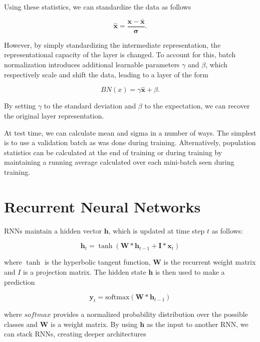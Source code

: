 \documentclass{article}
\def\x{{\mathbf x}}
\begin{document}
Using these statistics, we can standardize the data as follows

\begin{equation}
	\hat \x = \frac{\x - \bar \x}{\mathbf \sigma}.
\end{equation}

However, by simply standardizing the intermediate representation, the representational capacity of the layer is changed. To account for this, batch normalization introduces additional learnable parameters $\gamma$ and $\beta$, which respectively scale and shift the data, leading to a layer of the form

\begin{equation}
	BN(x) = \gamma \hat \x + \beta.
\end{equation}

By setting $\gamma$ to the standard deviation and $\beta$ to the expectation, we can recover the original layer representation.

At test time, we can calculate mean and sigma in a number of ways. The simplest is to use a validation batch as was done during training. Alternatively, population statistics can be calculated at the end of training or during training by maintaining a running average calculated over each mini-batch seen during training.

\section{Recurrent Neural Networks}
RNNs maintain a hidden vector $\mathbf h$, which is updated at time step $t$ as follows:
 
\begin{equation}
	\mathbf h_t = \tanh(\mathbf W * \mathbf h_{t-1} + \mathbf I * \x_t)
\end{equation}

where $\tanh$ is the hyperbolic tangent function, $\mathbf W$ is the recurrent weight matrix and $I$ is a projection matrix. The hidden state $\mathbf h$ is then used to make a prediction

\begin{equation}
	\mathbf y_t = \text{softmax}(\mathbf W * \mathbf h_{t-1})
\end{equation}

where $\textit{softmax}$ provides a normalized probability distribution over the possible classes and $\mathbf W$ is a weight matrix. By using $\mathbf h$ as the input to another RNN, we can stack RNNs, creating deeper architectures \citep{pascanu2013construct}
\end{document}
